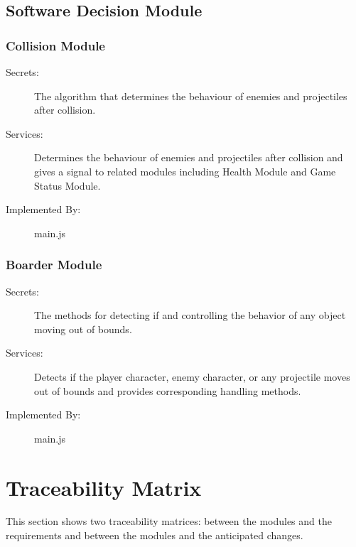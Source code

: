 \documentclass[12pt, titlepage]{article}
\begin{document}
\subsection{Software Decision Module}

\subsubsection{Collision Module}

\begin{description}
\item[Secrets:]The algorithm that determines the behaviour of enemies and projectiles after collision.
\item[Services:]Determines the behaviour of enemies and projectiles after collision and gives a signal to related modules including Health Module and Game Status Module.
\item[Implemented By:] main.js
\end{description}

\subsubsection{Boarder Module}

\begin{description}
\item[Secrets:]The methods for detecting if and controlling the behavior of any object moving out of bounds.
\item[Services:]Detects if the player character, enemy character, or any projectile moves out of bounds and provides corresponding handling methods.
\item[Implemented By:] main.js
\end{description}


\section{Traceability Matrix} \label{SecTM}

This section shows two traceability matrices: between the modules and the
requirements and between the modules and the anticipated changes.
\end{document}
